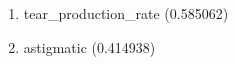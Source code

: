 \begin{enumerate}
\item tear\_production\_rate (0.585062)
\item astigmatic (0.414938)
\end{enumerate}